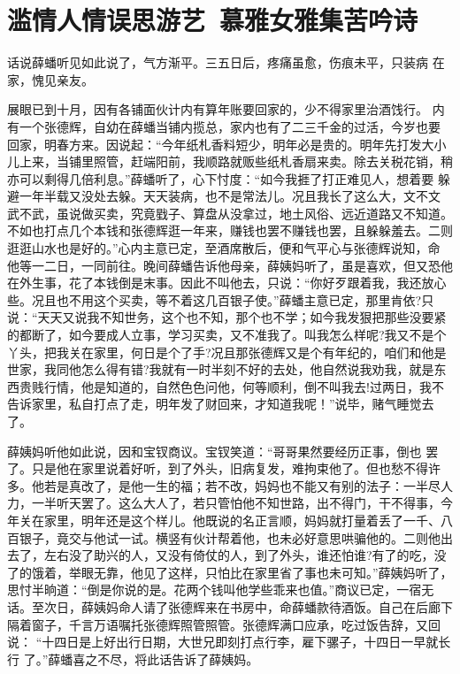 \chapter{滥情人情误思游艺~慕雅女雅集苦吟诗}

话说薛蟠听见如此说了，气方渐平。三五日后，疼痛虽愈，伤痕未平，只装病
在家，愧见亲友。

展眼已到十月，因有各铺面伙计内有算年账要回家的，少不得家里治酒饯行。
内有一个张德辉，自幼在薛蟠当铺内揽总，家内也有了二三千金的过活，今岁也要
回家，明春方来。因说起：“今年纸札香料短少，明年必是贵的。明年先打发大小
儿上来，当铺里照管，赶端阳前，我顺路就贩些纸札香扇来卖。除去关税花销，稍
亦可以剩得几倍利息。”薛蟠听了，心下忖度：“如今我捱了打正难见人，想着要
躲避一年半载又没处去躲。天天装病，也不是常法儿。况且我长了这么大，文不文
武不武，虽说做买卖，究竟戥子、算盘从没拿过，地土风俗、远近道路又不知道。
不如也打点几个本钱和张德辉逛一年来，赚钱也罢不赚钱也罢，且躲躲羞去。二则
逛逛山水也是好的。”心内主意已定，至酒席散后，便和气平心与张德辉说知，命
他等一二日，一同前往。晚间薛蟠告诉他母亲，薛姨妈听了，虽是喜欢，但又恐他
在外生事，花了本钱倒是末事。因此不叫他去，只说：“你好歹跟着我，我还放心
些。况且也不用这个买卖，等不着这几百银子使。”薛蟠主意已定，那里肯依?只
说：“天天又说我不知世务，这个也不知，那个也不学；如今我发狠把那些没要紧
的都断了，如今要成人立事，学习买卖，又不准我了。叫我怎么样呢?我又不是个
丫头，把我关在家里，何日是个了手?况且那张德辉又是个有年纪的，咱们和他是
世家，我同他怎么得有错?我就有一时半刻不好的去处，他自然说我劝我，就是东
西贵贱行情，他是知道的，自然色色问他，何等顺利，倒不叫我去!过两日，我不
告诉家里，私自打点了走，明年发了财回来，才知道我呢！”说毕，赌气睡觉去了。

薛姨妈听他如此说，因和宝钗商议。宝钗笑道：“哥哥果然要经历正事，倒也
罢了。只是他在家里说着好听，到了外头，旧病复发，难拘束他了。但也愁不得许
多。他若是真改了，是他一生的福；若不改，妈妈也不能又有别的法子：一半尽人
力，一半听天罢了。这么大人了，若只管怕他不知世路，出不得门，干不得事，今
年关在家里，明年还是这个样儿。他既说的名正言顺，妈妈就打量着丢了一千、八
百银子，竟交与他试一试。横竖有伙计帮着他，也未必好意思哄骗他的。二则他出
去了，左右没了助兴的人，又没有倚仗的人，到了外头，谁还怕谁?有了的吃，没
了的饿着，举眼无靠，他见了这样，只怕比在家里省了事也未可知。”薛姨妈听了，
思忖半晌道：“倒是你说的是。花两个钱叫他学些乖来也值。”商议已定，一宿无
话。至次日，薛姨妈命人请了张德辉来在书房中，命薛蟠款待酒饭。自己在后廊下
隔着窗子，千言万语嘱托张德辉照管照管。张德辉满口应承，吃过饭告辞，又回说：
“十四日是上好出行日期，大世兄即刻打点行李，雇下骡子，十四日一早就长行
了。”薛蟠喜之不尽，将此话告诉了薛姨妈。

